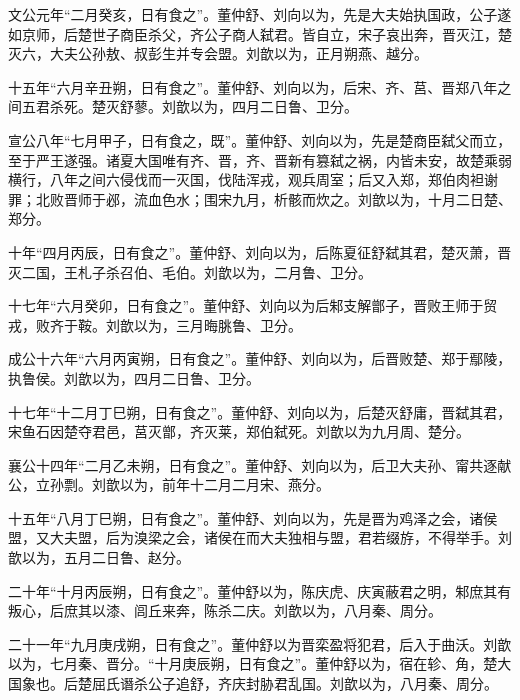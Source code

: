 \documentclass[12pt,UTF8]{ctexbook}
\begin{document}
文公元年“二月癸亥，日有食之”。董仲舒、刘向以为，先是大夫始执国政，公子遂如京师，后楚世子商臣杀父，齐公子商人弑君。皆自立，宋子哀出奔，晋灭江，楚灭六，大夫公孙敖、叔彭生并专会盟。刘歆以为，正月朔燕、越分。



十五年“六月辛丑朔，日有食之”。董仲舒、刘向以为，后宋、齐、莒、晋郑八年之间五君杀死。楚灭舒蓼。刘歆以为，四月二日鲁、卫分。



宣公八年“七月甲子，日有食之，既”。董仲舒、刘向以为，先是楚商臣弑父而立，至于严王遂强。诸夏大国唯有齐、晋，齐、晋新有篡弑之祸，内皆未安，故楚乘弱横行，八年之间六侵伐而一灭国，伐陆浑戎，观兵周室；后又入郑，郑伯肉袒谢罪；北败晋师于邲，流血色水；围宋九月，析骸而炊之。刘歆以为，十月二日楚、郑分。



十年“四月丙辰，日有食之”。董仲舒、刘向以为，后陈夏征舒弑其君，楚灭萧，晋灭二国，王札子杀召伯、毛伯。刘歆以为，二月鲁、卫分。



十七年“六月癸卯，日有食之”。董仲舒、刘向以为后邾支解鄫子，晋败王师于贸戎，败齐于鞍。刘歆以为，三月晦朓鲁、卫分。



成公十六年“六月丙寅朔，日有食之”。董仲舒、刘向以为，后晋败楚、郑于鄢陵，执鲁侯。刘歆以为，四月二日鲁、卫分。



十七年“十二月丁巳朔，日有食之”。董仲舒、刘向以为，后楚灭舒庸，晋弑其君，宋鱼石因楚夺君邑，莒灭鄫，齐灭莱，郑伯弑死。刘歆以为九月周、楚分。



襄公十四年“二月乙未朔，日有食之”。董仲舒、刘向以为，后卫大夫孙、甯共逐献公，立孙剽。刘歆以为，前年十二月二月宋、燕分。



十五年“八月丁巳朔，日有食之”。董仲舒、刘向以为，先是晋为鸡泽之会，诸侯盟，又大夫盟，后为溴梁之会，诸侯在而大夫独相与盟，君若缀斿，不得举手。刘歆以为，五月二日鲁、赵分。



二十年“十月丙辰朔，日有食之”。董仲舒以为，陈庆虎、庆寅蔽君之明，邾庶其有叛心，后庶其以漆、闾丘来奔，陈杀二庆。刘歆以为，八月秦、周分。



二十一年“九月庚戌朔，日有食之”。董仲舒以为晋栾盈将犯君，后入于曲沃。刘歆以为，七月秦、晋分。“十月庚辰朔，日有食之”。董仲舒以为，宿在轸、角，楚大国象也。后楚屈氏谮杀公子追舒，齐庆封胁君乱国。刘歆以为，八月秦、周分。
\end{document}
